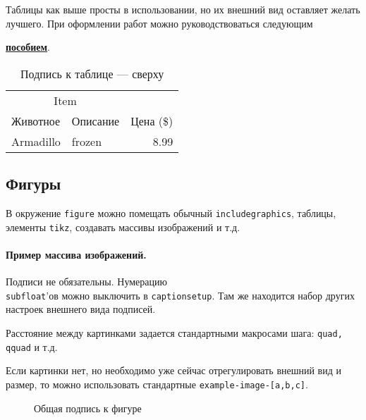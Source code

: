 Таблицы как выше просты в использовании, но их внешний вид оставляет желать лучшего. При оформлении работ можно руководствоваться следующим {\href{https://www.inf.ethz.ch/personal/markusp/teaching/guides/guide-tables.pdf}{\textbf{пособием}}.


\begin{table}[H]
    \centering
    \caption{\label{tab:widgets}Подпись к таблице --- сверху}
    \begin{tabular}{llr}
        \toprule
                  \multicolumn{2}{c}{Item}            &  \\
        \cmidrule(r){1-2}
        Животное & Описание & Цена (\$) \\ \midrule
        Armadillo                          & frozen   &      8.99 \\ \bottomrule
    \end{tabular}
\end{table}


\subsection{Фигуры}
В окружение \texttt{figure} можно помещать обычный \texttt{includegraphics}, таблицы, элементы \texttt{tikz}, создавать массивы изображений и т.д.

\paragraph{Пример массива изображений.}
Подписи не обязательны. Нумерацию \\ \texttt{subfloat}'ов можно выключить в \texttt{captionsetup}. Там же находится набор других настроек внешнего вида подписей.

Расстояние между картинками задается стандартными макросами шага: \texttt{quad, qquad} и т.д.

Если картинки нет, но необходимо уже сейчас отрегулировать внешний вид и размер, то можно использовать стандартные \texttt{example-image-[a,b,c]}.

\begin{figure}[H]
    \centering
    \captionsetup[subfigure]{justification=centering}
    \quad
    \quad
    \quad
    \caption{Общая подпись к фигуре}
\end{figure}

}
